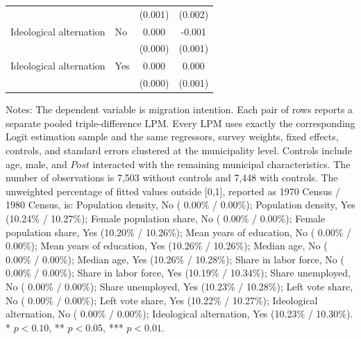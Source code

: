 \begin{table}[!htbp]
\begin{tabular}{llcc}
 & & (0.001) & (0.002) \\
\addlinespace
Ideological alternation & No & 0.000 & -0.001 \\
 & & (0.000) & (0.001) \\
Ideological alternation & Yes & 0.000 & 0.000 \\
 & & (0.000) & (0.001) \\
\hline
\end{tabular}
\par\vspace{1.5mm}
\begin{minipage}{0.98\linewidth}
\footnotesize\setlength{\parindent}{0pt}\setlength{\parskip}{1pt}
Notes: The dependent variable is migration intention. Each pair of rows reports a separate pooled triple-difference LPM. Every LPM uses exactly the corresponding Logit estimation sample and the same regressors, survey weights, fixed effects, controls, and standard errors clustered at the municipality level. Controls include age, male, and \(Post\) interacted with the remaining municipal characteristics. The number of observations is        7,503 without controls and        7,448 with controls. The unweighted percentage of fitted values outside [0,1], reported as 1970 Census / 1980 Census, is: Population density, No ( 0.00\% /  0.00\%); Population density, Yes (10.24\% / 10.27\%); Female population share, No ( 0.00\% /  0.00\%); Female population share, Yes (10.20\% / 10.26\%); Mean years of education, No ( 0.00\% /  0.00\%); Mean years of education, Yes (10.26\% / 10.26\%); Median age, No ( 0.00\% /  0.00\%); Median age, Yes (10.26\% / 10.28\%); Share in labor force, No ( 0.00\% /  0.00\%); Share in labor force, Yes (10.19\% / 10.34\%); Share unemployed, No ( 0.00\% /  0.00\%); Share unemployed, Yes (10.23\% / 10.28\%); Left vote share, No ( 0.00\% /  0.00\%); Left vote share, Yes (10.22\% / 10.27\%); Ideological alternation, No ( 0.00\% /  0.00\%); Ideological alternation, Yes (10.23\% / 10.30\%). * \(p<0.10\), ** \(p<0.05\), *** \(p<0.01\).
\end{minipage}
\end{table}
